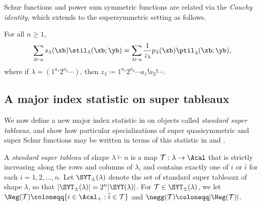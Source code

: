 Schur functions and power sum symmetric functions are related via the \emph{Cauchy identity}, which extends to the supersymmetric setting as follows.
\begin{thm}\label{lem:s-p}
    For all $n \ge 1$,
    \[
    \sum_{\lambda \vdash n} s_\lambda(\xb) \stil_\lambda(\xb;\yb) = \sum_{\lambda \vdash n} \frac{1}{z_\lambda} p_\lambda(\xb) \ptil_\lambda(\xb;\yb),
    \]
    where if $\lambda = (1^{a_1}2^{a_2} \cdots)$, then $z_\lambda \coloneqq 1^{a_1}2^{a_2} \cdots a_1!a_2! \cdots$.
\end{thm}

\subsection{A major index statistic on super tableaux}\label{sec:super-des} We now define a new major index statistic in  on objects called \emph{standard super tableaux}, and show how particular specializations of super quasisymmetric and super Schur functions may be written in terms of this statistic in  and .
\begin{defi}
    A \emph{standard super tableau} of shape $\lambda \vdash n$ is a map $\mathcal{T} : \lambda \to \Acal$ that is strictly increasing along the rows and columns of $\lambda$, and contains exactly one of $i$ or $\overline{i}$ for each $i = 1, 2, \ldots, n$. Let $\SYT_\pm(\lambda)$ denote the set of standard super tableaux of shape $\lambda$, so that $|\SYT_\pm(\lambda)| = 2^n|\SYT(\lambda)|$. For $\mathcal{T} \in \SYT_\pm(\lambda)$, we let $\Neg(\mathcal{T}) \coloneqq \{ i \in \Acal_+ : \overline{i} \in \mathcal{T} \}$ and $\negg(\mathcal{T}) \coloneqq |\Neg(\mathcal{T})|$.
\end{defi}
